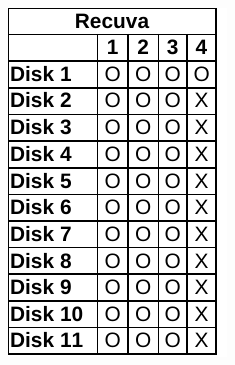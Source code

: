 \begin{paraphrase}
\begin{figure}
\begin{subfigure}{0.17\linewidth}
        \includegraphics[width=\linewidth]{fig/recuva_results_fat.pdf}
    \end{subfigure}~~
    \begin{subfigure}{0.17\linewidth}

\end{subfigure}
\end{figure}
\end{paraphrase}

